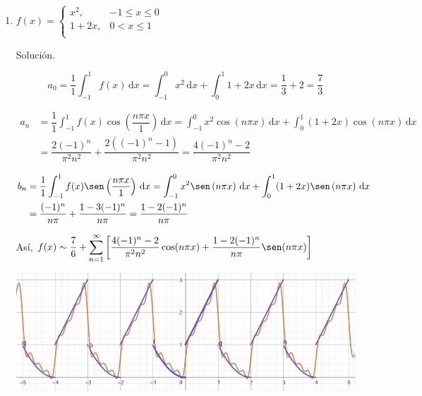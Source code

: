 \documentclass[fleqn]{article}
\newcommand{\intg}[3]{\int_{#1}^{#2} #3 \, \mathrm{d}x}
\begin{document}
\begin{enumerate}[I.]
\begin{enumerate}[(1)]

			\bfseries
			\item $ f(x) = \begin{cases}
				x^2, & -1 \leq x \leq 0 \\
				1 + 2x, & 0 < x \leq 1 \\
			\end{cases} $

			Solución.

			\normalfont

			\begin{equation*}
				a_0 = \dfrac{1}{1} \intg{-1}{1}{f(x)} = \intg{-1}{0}{x^2} + \intg{0}{1}{1 + 2x} = \dfrac{1}{3} + 2 = \dfrac{7}{3}
			\end{equation*}

			\begin{align*}
				a_n &= \dfrac{1}{1} \intg{-1}{1}{f(x) \cos \left( \dfrac{n \pi x}{1} \right)} = \intg{-1}{0}{x^2 \cos \left(n \pi x \right)} + \intg{0}{1}{(1 + 2x) \cos \left(n \pi x \right)} \\
				&= \dfrac{2(-1)^n}{\pi^2 n^2} + \dfrac{2((-1)^n - 1)}{\pi^2 n^2} = \dfrac{4(-1)^n - 2}{\pi^2 n^2} 
			\end{align*}

			\begin{align*}
				b_n &= \dfrac{1}{1} \intg{-1}{1}{f(x) \sen \left( \dfrac{n \pi x}{1} \right)} = \intg{-1}{0}{x^2 \sen \left(n \pi x \right)} + \intg{0}{1}{(1 + 2x) \sen \left(n \pi x \right)} \\
				&= \dfrac{(-1)^n}{n \pi} + \dfrac{1 - 3(-1)^n}{n \pi} = \dfrac{1 - 2(-1)^n}{n \pi}
			\end{align*}

			Así, $ \displaystyle f(x) \sim \dfrac{7}{6} + \sum_{n=1}^{\infty} \left[ \dfrac{4(-1)^n - 2}{\pi^2 n^2} \cos (n \pi x) + \dfrac{1 - 2(-1)^n}{n \pi} \sen (n \pi x) \right] $

			\includegraphics[width=0.95\linewidth]{Ejer4.jpg}


\end{enumerate}
\end{enumerate}
\end{document}
